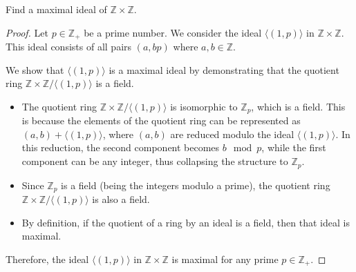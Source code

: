 \documentclass[12pt]{amsart}
\theoremstyle{definition}
\numberwithin{equation}{section}
\theoremstyle{plain}
\newcommand{\Z}{\mathbb{Z}}
\begin{document}
\begin{exercise}{15} Find a maximal ideal of $\Z \times \Z$.
\begin{proof}
Let \( p \in \mathbb{Z}_+ \) be a prime number. We consider the ideal \( \langle(1, p)\rangle \) in \( \mathbb{Z} \times \mathbb{Z} \). This ideal consists of all pairs \( (a, bp) \) where \( a, b \in \mathbb{Z} \).

We show that \( \langle(1, p)\rangle \) is a maximal ideal by demonstrating that the quotient ring \( \mathbb{Z} \times \mathbb{Z}/\langle(1, p)\rangle \) is a field.

\begin{itemize}
    \item The quotient ring \( \mathbb{Z} \times \mathbb{Z}/\langle(1, p)\rangle \) is isomorphic to \( \mathbb{Z}_p \), which is a field. This is because the elements of the quotient ring can be represented as \( (a, b) + \langle(1, p)\rangle \), where \( (a, b) \) are reduced modulo the ideal \( \langle(1, p)\rangle \). In this reduction, the second component becomes \( b \mod p \), while the first component can be any integer, thus collapsing the structure to \( \mathbb{Z}_p \).
    
    \item Since \( \mathbb{Z}_p \) is a field (being the integers modulo a prime), the quotient ring \( \mathbb{Z} \times \mathbb{Z}/\langle(1, p)\rangle \) is also a field.
    
    \item By definition, if the quotient of a ring by an ideal is a field, then that ideal is maximal.
\end{itemize}

Therefore, the ideal \( \langle(1, p)\rangle \) in \( \mathbb{Z} \times \mathbb{Z} \) is maximal for any prime \( p \in \mathbb{Z}_+ \).
\end{proof}
\end{exercise}
\vspace*{20pt} 
\end{document}
